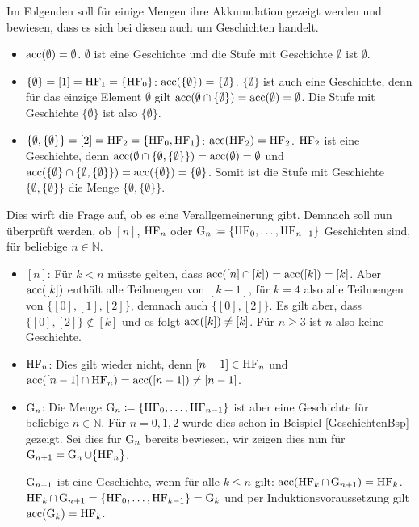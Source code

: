 \begin{example}
	Im Folgenden soll für einige Mengen ihre Akkumulation gezeigt werden und bewiesen, dass es sich bei diesen auch um Geschichten handelt.
	\begin{itemize}
		\item $\operatorname{acc}(\emptyset)=\emptyset$. $\emptyset$ ist eine Geschichte und die Stufe mit Geschichte $\emptyset$ ist $\emptyset$.
		\item $\{\emptyset\} = [1] = \operatorname{HF}_1 = \{\operatorname{HF}_0\}$: $\operatorname{acc}(\{\emptyset\}) = \{\emptyset\}$. 
		$\{\emptyset\}$ ist auch eine Geschichte, denn für das einzige Element $\emptyset$ gilt $\operatorname{acc}(\emptyset \cap \{\emptyset\})=\operatorname{acc}(\emptyset)=\emptyset$. 
		Die Stufe mit Geschichte $\{\emptyset\}$ ist also $\{\emptyset\}$.
		\item $\{\emptyset, \{\emptyset\}\}=[2]=\operatorname{HF}_2=\{\operatorname{HF}_0, \operatorname{HF}_1\}$: $\operatorname{acc}(\operatorname{HF}_2)=\operatorname{HF}_2$.
		$\operatorname{HF}_2$ ist eine Geschichte, denn $\operatorname{acc}(\emptyset \cap \{\emptyset, \{\emptyset\}\})=\operatorname{acc}(\emptyset)=\emptyset$ und $\operatorname{acc}(\{\emptyset\}\cap \{\emptyset, \{\emptyset\}\})=\operatorname{acc}(\{\emptyset\})=\{\emptyset\}$. Somit ist die Stufe mit Geschichte $\{\emptyset, \{\emptyset\}\}$ die Menge $\{\emptyset, \{\emptyset\}\}$.
	\end{itemize}
\label{GeschichtenBsp}
\end{example}

Dies wirft die Frage auf, ob es eine Verallgemeinerung gibt. 
Demnach soll nun überprüft werden, ob $[n]$, $\operatorname{HF}_n$ oder $\operatorname{G}_n\coloneqq \{\operatorname{HF}_0, \dots, \operatorname{HF}_{n-1}\}$ Geschichten sind, für beliebige $n\in \mathbb{N}$.
\begin{itemize}
	\item $[n]$: Für $k<n$ müsste gelten, dass $\operatorname{acc}([n]\cap[k])=\operatorname{acc}([k])=[k]$. 
	Aber $\operatorname{acc}([k])$ enthält alle Teilmengen von $[k-1]$, für $k=4$ also alle Teilmengen von $\{[0],[1],[2]\}$, demnach auch $\{[0], [2]\}$. Es gilt aber, dass $\{[0],[2]\}\notin [k]$ und es folgt $\operatorname{acc}([k])\neq[k]$. Für $n \geq 3$ ist $n$ also keine Geschichte.
	
	\item $\operatorname{HF}_n$: Dies gilt wieder nicht, denn $[n-1]\in \operatorname{HF}_n$ und $\operatorname{acc}([n-1]\cap \operatorname{HF}_n)=\operatorname{acc}([n-1])\neq[n-1]$.
	
	\item $\operatorname{G}_n$: Die Menge $\operatorname{G}_n\coloneqq \{\operatorname{HF}_0, \dots, \operatorname{HF}_{n-1}\}$ ist aber eine Geschichte für beliebige $n\in \mathbb{N}$. Für $n=0,1,2$ wurde dies schon in Beispiel \ref{GeschichtenBsp} gezeigt. Sei dies für $\operatorname{G}_n$ bereits bewiesen, wir zeigen dies nun für $\operatorname{G}_{n+1}=\operatorname{G}_n\cup\{\operatorname{HF}_n\}$.
	
	$\operatorname{G}_{n+1}$ ist eine Geschichte, wenn für alle $k \leq n$ gilt: $\operatorname{acc}(\operatorname{HF}_k\cap \operatorname{G}_{n+1})=\operatorname{HF}_k$.
	$\operatorname{HF}_k \cap \operatorname{G}_{n+1} = \{\operatorname{HF}_0,\dots,\operatorname{HF}_{k-1}\}=\operatorname{G}_k$ und per Induktionsvoraussetzung gilt $\operatorname{acc}(\operatorname{G}_k)=\operatorname{HF}_k$.
\end{itemize}

